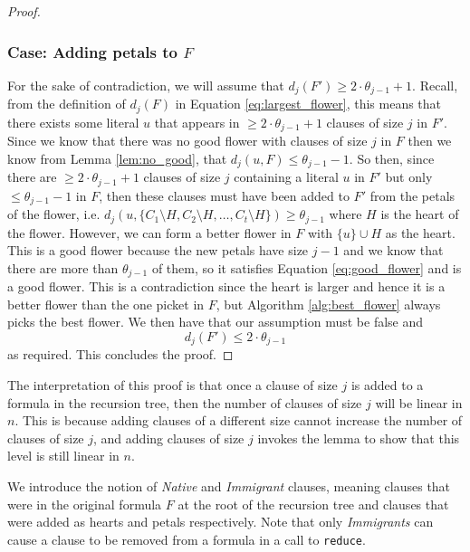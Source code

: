 \begin{proof}
    \subsubsection{Case: Adding petals to $F$}
    For the sake of contradiction, we will assume that $d_j(F') \geq 2 \cdot \theta_{j-1} + 1$.
    Recall, from the definition of $d_j(F)$ in Equation \ref{eq:largest_flower}, this means that there exists some literal
    $u$ that appears in $\geq 2 \cdot \theta_{j-1} + 1$ clauses of size $j$ in $F'$. Since
    we know that there was no good flower with clauses of size $j$ in $F$ then we know
    from Lemma \ref{lem:no_good}, that $d_j(u, F) \leq \theta_{j-1} - 1$. So then, since
    there are $\geq 2 \cdot \theta_{j-1} + 1$ clauses of size $j$ containing a literal $u$ in $F'$
    but only $\leq \theta_{j-1} - 1$ in $F$, then these clauses must have been added to $F'$
    from the petals of the flower, i.e. $d_j(u, \{C_1 \setminus H, C_2 \setminus H, \dots, C_t \setminus H\}) \geq \theta_{j-1}$ where $H$ is the heart of the flower. However, we can form a better flower in $F$ with $\{u\} \cup H$
    as the heart. This is a good flower because the new petals have
    size $j-1$ and we know that there are more than $\theta_{j-1}$ of them,
    so it satisfies Equation \ref{eq:good_flower} and
    is a good flower. This is a contradiction since the heart is larger and hence it is a better flower than
    the one picket in $F$, but Algorithm \ref{alg:best_flower} always picks the best flower.
    We then have that our assumption must be false and
    \begin{equation}
        d_j(F') \leq 2 \cdot \theta_{j - 1}
    \end{equation}
    as required. This concludes the proof.
\end{proof}
The interpretation of this proof is that once a clause of size $j$ is added to a formula
in the recursion tree, then the number of clauses of size $j$ will be linear in $n$. This is because
adding clauses of a different size cannot increase the number of clauses of size $j$, and
adding clauses of size $j$ invokes the lemma to show that this level is still linear in $n$.

We introduce the notion of \textit{Native} and \textit{Immigrant} clauses, meaning clauses
that were in the original formula $F$ at the root of the recursion tree
and clauses that were added as hearts and petals respectively.
Note that only \textit{Immigrants} can cause a clause to be removed from a formula in a call to
\texttt{reduce}.

